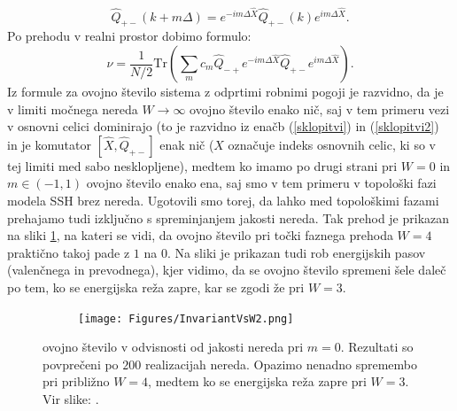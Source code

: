 \begin{equation}
\hat{Q}_{+-}(k+m \Delta ) =e ^{-i m \Delta  \hat{X}} \hat{Q}_{+-}(k) e^{i m \Delta  \hat{X}}.
\end{equation}
 Po prehodu v realni prostor dobimo formulo:
\begin{equation}
\nu = \frac{1}{N/2} \mathrm{Tr} (\sum_m c_m \hat{Q}_{-+} e^{-im \Delta \hat{X}} \hat{Q}_{+-} e^{im \Delta \hat{X}}).
\end{equation}
Iz formule za ovojno število sistema z odprtimi robnimi pogoji je razvidno, da je v limiti močnega nereda $W \to \infty$ ovojno število enako nič, saj v tem primeru vezi v osnovni celici dominirajo (to je razvidno iz enačb (\ref{sklopitvi}) in (\ref{sklopitvi2}) in je komutator $[\hat{X},\hat{Q}_{+-}]$ enak nič ($X$ označuje indeks osnovnih celic, ki so v tej limiti med sabo nesklopljene), medtem ko imamo po drugi strani pri $W=0$ in $m \in (-1,1)$ ovojno število enako ena, saj smo v tem primeru v topološki fazi modela SSH brez nereda. Ugotovili smo torej, da lahko med topološkimi fazami prehajamo tudi izključno s spreminjanjem jakosti nereda. Tak prehod je prikazan na sliki \ref{fig:InvariantVsW}, na kateri se vidi, da ovojno število pri točki faznega prehoda $W=4$ praktično takoj pade z $1$ na $0$. Na sliki je prikazan tudi rob energijskih pasov (valenčnega in prevodnega), kjer vidimo, da se ovojno število spremeni šele daleč po tem, ko se energijska reža zapre, kar se zgodi že pri $W=3$.
\begin{figure}[!h]
\centering
\begin{subfigure}{.7\textwidth}
\texttt{[image: Figures/InvariantVsW2.png]}
\end{subfigure}
\caption{ovojno število v odvisnosti od jakosti nereda pri $m=0$. Rezultati so povprečeni po $200$ realizacijah nereda. Opazimo nenadno spremembo pri približno $W=4$, medtem ko se energijska reža zapre pri $W=3$. Vir slike: \cite{mondragon}.}
\label{fig:InvariantVsW}
\end{figure}

